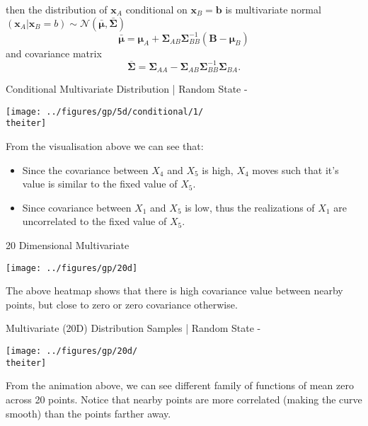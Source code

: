 \documentclass{beamer}
\begin{document}
	\begin{frame}
		then the distribution of $\mathbf{x}_A$ conditional on $\mathbf{x}_B = \mathbf{b}$ is multivariate normal $(\mathbf{x}_A|\mathbf{x}_B=b)\sim \mathcal{N}(\bar{\mathbf{\mu}}, \bar{\mathbf{\Sigma}})$
		$$\bar{\boldsymbol\mu}
		=
		\boldsymbol\mu_A + \boldsymbol\Sigma_{AB} \boldsymbol\Sigma_{BB}^{-1}
		\left(
		\mathbf{B} - \boldsymbol\mu_B
		\right)$$
		and covariance matrix
		$$\overline{\boldsymbol\Sigma}
		=
		\boldsymbol\Sigma_{AA} - \boldsymbol\Sigma_{AB} \boldsymbol\Sigma_{BB}^{-1} \boldsymbol\Sigma_{BA}.$$
		
	\end{frame}
	
	{%
		\begin{frame}{Conditional Multivariate Distribution | Random State - \theiter}
			\begin{center}
				\texttt{[image: ../figures/gp/5d/conditional/1/\\theiter]}
			\end{center}
			From the visualisation above we can see that:
			\begin{itemize}
				\item Since the covariance between $X_4$ and $X_5$ is high, $X_4$ moves such that it's value is similar to the fixed value of $X_5$.
				\item Since covariance between $X_1$ and $X_5$ is low, thus the realizations of $X_1$ are uncorrelated to the fixed value of $X_5$.
			\end{itemize}
		\end{frame}
	}
	
	\begin{frame}{20 Dimensional Multivariate}
		\begin{center}
			\texttt{[image: ../figures/gp/20d]}\\
		\end{center}	
		The above heatmap shows that there is high covariance value between nearby points, but close to zero or zero covariance otherwise.
	\end{frame}
	
	{%
		\begin{frame}{Multivariate (20D) Distribution Samples | Random State - \theiter}
			\begin{center}
				\texttt{[image: ../figures/gp/20d/\\theiter]}
			\end{center}
			From the animation above, we can see different family of functions of mean zero across 20 points. Notice that nearby points are more correlated (making the curve smooth) than the points farther away.
		\end{frame}
	}
	
\end{document}
